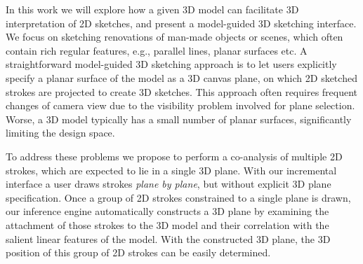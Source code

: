 
In this work we will explore how a given 3D model can facilitate 3D interpretation of 2D sketches, and present a model-guided 3D sketching interface. We focus on sketching renovations of man-made objects or scenes, which often contain rich regular features, e.g., parallel lines, planar surfaces etc. A straightforward model-guided 3D sketching approach is to let users explicitly specify a planar surface of the model as a 3D canvas plane, on which 2D sketched strokes are projected to create 3D sketches. This approach often requires frequent changes of camera view due to the  visibility problem involved for plane selection. Worse, a 3D model typically has a small number of planar surfaces, significantly limiting the design space.

To address these problems we propose to perform a co-analysis of multiple 2D strokes, which are expected to lie in a single 3D plane. With our incremental interface a user draws strokes \emph{plane by plane},
but without explicit 3D plane specification. Once a group of 2D strokes constrained to a single plane is drawn, our inference engine automatically constructs a 3D plane by examining the attachment of those strokes to the 3D model and their correlation with the salient linear features of the model. With the constructed 3D plane, the 3D position of this group of 2D strokes can be easily determined.


